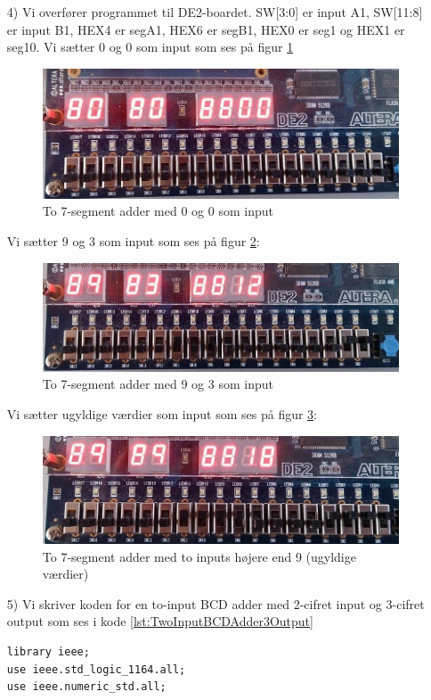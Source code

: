 \begin{enumerate}
\item[4)]
Vi overfører programmet til DE2-boardet. SW[3:0] er input A1, SW[11:8] er input B1, HEX4 er segA1, HEX6 er segB1, HEX0 er seg1 og HEX1 er seg10. Vi sætter 0 og 0 som input som ses på figur \ref{fig:7SegAdder0}
	\begin{figure}[h]
		\centering
		\includegraphics[scale=0.6]{pictures/Oevelse4/BCD_adder/BCD_1seg_adder_0.jpg}
		\caption{To 7-segment adder med 0 og 0 som input}
		\label{fig:7SegAdder0}
	\end{figure}
	Vi sætter 9 og 3 som input som ses på figur \ref{fig:7SegAdder12}:
	\begin{figure}[h]
		\centering
		\includegraphics[scale=0.6]{pictures/Oevelse4/BCD_adder/BCD_1seg_adder_12.jpg}
		\caption{To 7-segment adder med 9 og 3 som input}
		\label{fig:7SegAdder12}
	\end{figure}
	Vi sætter ugyldige værdier som input som ses på figur \ref{fig:7SegAdderUgyldig}:
	\begin{figure}[h]
		\centering
		\includegraphics[scale=0.6]{pictures/Oevelse4/BCD_adder/BCD_1seg_adder_ugyldig.jpg}
		\caption{To 7-segment adder med to inputs højere end 9 (ugyldige værdier)}
		\label{fig:7SegAdderUgyldig}
	\end{figure}
\item[5)]
Vi skriver koden for en to-input BCD adder med 2-cifret input og 3-cifret output som ses i kode \ref{lst:TwoInputBCDAdder3Output}
		\begin{lstlisting}[caption={To-input BCD adder med 3-cifret output},label={lst:TwoInputBCDAdder3Output}]
library ieee;
use ieee.std_logic_1164.all;
use ieee.numeric_std.all;


\end{lstlisting}
\end{enumerate}

